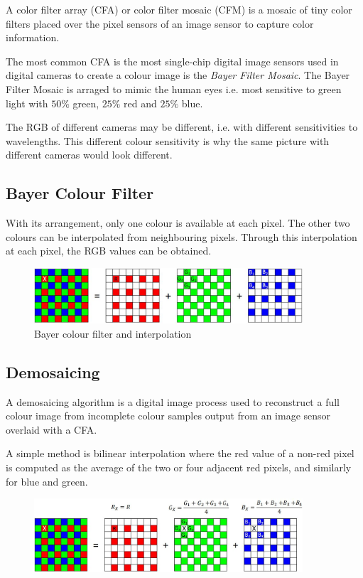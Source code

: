 \documentclass{report}
\begin{document}
A color filter array (CFA) or color filter mosaic (CFM) is a mosaic of tiny
color filters placed over the pixel sensors of an image sensor to capture color
information.  

The most common CFA is the most single-chip digital image sensors used in
digital cameras to create a colour image is the \textit{Bayer Filter Mosaic}.
The Bayer Filter Mosaic is arraged to mimic the human eyes i.e. most sensitive
to green light with $50\%$ green, $25\%$ red and $25\%$ blue.

The RGB of different cameras may be different, i.e. with different sensitivities
to wavelengths. This different colour sensitivity is why the same picture with
different cameras would look different.

\subsection{Bayer Colour Filter}

With its arrangement, only one colour is available at each pixel. The other two
colours can be interpolated from neighbouring pixels. Through this
interpolation at each pixel, the RGB values can be obtained. 
\begin{figure}[h]
    \centering
    \includegraphics[width=10cm]{Bayer colour filter.JPG}
    \caption{Bayer colour filter and interpolation}
\end{figure}

\subsection{Demosaicing}

A demosaicing algorithm is a digital image process used to reconstruct a full
colour image from incomplete colour samples output from an image sensor overlaid
with a CFA.

A simple method is bilinear interpolation where the red value of a non-red pixel
is computed as the average of the two or four adjacent red pixels, and similarly
for blue and green.  
\begin{figure}[h]
    \centering
    \includegraphics[width=10cm]{Demosaicing algorithm.JPG}
\end{figure}
\end{document}
